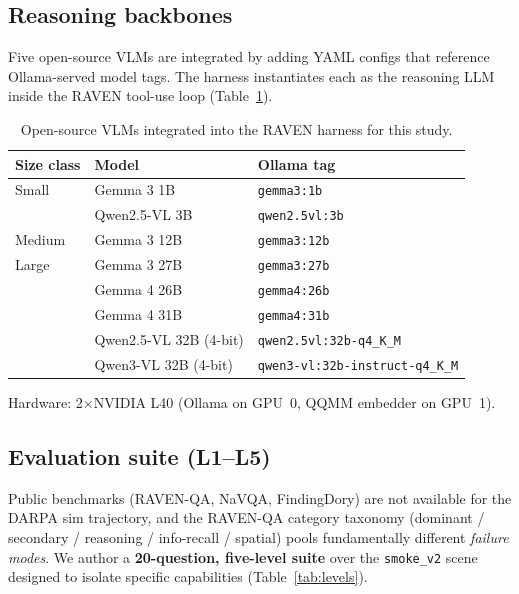 \documentclass[11pt]{article}
\begin{document}
\subsection{Reasoning backbones}
Five open-source VLMs are integrated by adding YAML configs that reference Ollama-served model tags. The harness instantiates each as the reasoning LLM inside the RAVEN tool-use loop (Table~\ref{tab:vlms}).

\begin{table}[h]
\centering
\small
\caption{Open-source VLMs integrated into the RAVEN harness for this study.}
\label{tab:vlms}
\begin{tabular}{lll}
\toprule
\textbf{Size class} & \textbf{Model} & \textbf{Ollama tag} \\
\midrule
Small  & Gemma 3 1B          & \texttt{gemma3:1b} \\
       & Qwen2.5-VL 3B       & \texttt{qwen2.5vl:3b} \\
Medium & Gemma 3 12B         & \texttt{gemma3:12b} \\
Large  & Gemma 3 27B         & \texttt{gemma3:27b} \\
       & Gemma 4 26B         & \texttt{gemma4:26b} \\
       & Gemma 4 31B         & \texttt{gemma4:31b} \\
       & Qwen2.5-VL 32B (4-bit) & \texttt{qwen2.5vl:32b-q4\_K\_M} \\
       & Qwen3-VL 32B (4-bit)   & \texttt{qwen3-vl:32b-instruct-q4\_K\_M} \\
\bottomrule
\end{tabular}
\end{table}

Hardware: 2$\times$NVIDIA L40 (Ollama on GPU~0, QQMM embedder on GPU~1).

\subsection{Evaluation suite (L1--L5)}
Public benchmarks (RAVEN-QA, NaVQA, FindingDory) are not available for the DARPA sim trajectory, and the RAVEN-QA category taxonomy (dominant / secondary / reasoning / info-recall / spatial) pools fundamentally different \emph{failure modes}. We author a \textbf{20-question, five-level suite} over the \texttt{smoke\_v2} scene designed to isolate specific capabilities (Table~\ref{tab:levels}).
\end{document}
